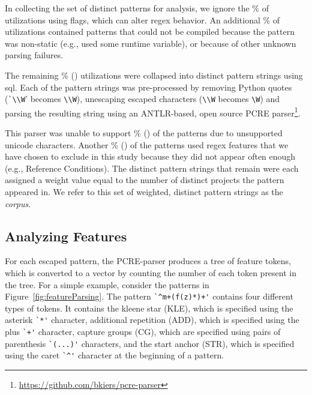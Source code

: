 In collecting the set of distinct patterns for analysis,  we ignore the \%  of utilizations using flags, which can alter regex behavior.  An additional \% of utilizations contained patterns that could not be compiled because the pattern was non-static (e.g., used some runtime variable), or because of other unknown parsing failures.

The remaining \% () utilizations were collapsed into  distinct pattern strings using sql.  Each of the pattern strings was pre-processed by removing Python quotes (\verb!`\\W!' becomes \verb!\\W!), unescaping escaped characters (\verb!\\W! becomes \verb!\W!) and parsing the resulting  string using an ANTLR-based, open source PCRE parser\footnote{\url{https://github.com/bkiers/pcre-parser}}.

This parser was unable to support \% () of the patterns due to unsupported unicode characters.  Another \% () of the patterns used regex features that we have chosen to exclude in this study because they did not appear often enough (e.g., Reference Conditions).  The  distinct pattern strings that remain were each assigned a weight value equal to the number of distinct projects the pattern appeared in.  We  refer to this set of weighted, distinct pattern strings as the \emph{corpus}.

\subsection{Analyzing Features}
\label{study:features}
For each escaped pattern, the PCRE-parser produces a tree of feature tokens, which is converted to a vector by counting the number of each token present in the tree.  For a simple example, consider the patterns in Figure~\ref{fig:featureParsing}.  The pattern \verb!`^m+(f(z)*)+'! contains four different types of tokens. It contains the kleene star (KLE), which is specified using the asterisk \verb!`*'! character, additional repetition (ADD), which is specified using the plus \verb!`+'! character, capture groups (CG), which are specified using pairs of parenthesis \verb!`(...)'! characters, and the start anchor (STR), which is specified using the caret \verb!`^'! character at the beginning of a pattern.

